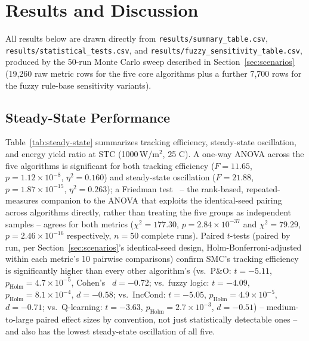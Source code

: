 \section{Results and Discussion}
\label{sec:results}

All results below are drawn directly from
\texttt{results/summary\_table.csv}, \texttt{results/statistical\_tests.csv},
and \texttt{results/fuzzy\_sensitivity\_table.csv}, produced by the 50-run
Monte Carlo sweep described in Section~\ref{sec:scenarios} (19,260 raw
metric rows for the five core algorithms plus a further 7,700 rows for the
fuzzy rule-base sensitivity variants).

\subsection{Steady-State Performance}
Table~\ref{tab:steady-state} summarizes tracking efficiency, steady-state
oscillation, and energy yield ratio at STC (1000\,W/m$^2$, 25\textdegree
C). A one-way ANOVA across the five algorithms is significant for both
tracking efficiency ($F=11.65$, $p=1.12\times10^{-8}$, $\eta^2=0.160$) and
steady-state oscillation ($F=21.88$, $p=1.87\times10^{-15}$,
$\eta^2=0.263$); a Friedman test~\cite{friedman1937use} -- the rank-based,
repeated-measures companion to the ANOVA that exploits the identical-seed
pairing across algorithms directly, rather than treating the five groups
as independent samples -- agrees for both metrics ($\chi^2=177.30$,
$p=2.84\times10^{-37}$ and $\chi^2=79.29$, $p=2.46\times10^{-16}$
respectively, $n=50$ complete runs). Paired $t$-tests (paired by run, per
Section~\ref{sec:scenarios}'s identical-seed design, Holm-Bonferroni-adjusted~\cite{holm1979simple}
within each metric's 10 pairwise comparisons) confirm SMC's tracking
efficiency is significantly higher than every other algorithm's (vs.\
P\&O: $t=-5.11$, $p_{\text{Holm}}=4.7\times10^{-5}$, Cohen's~\cite{cohen1988statistical} $d=-0.72$;
vs.\ fuzzy logic: $t=-4.09$, $p_{\text{Holm}}=8.1\times10^{-4}$, $d=-0.58$;
vs.\ IncCond: $t=-5.05$, $p_{\text{Holm}}=4.9\times10^{-5}$, $d=-0.71$;
vs.\ Q-learning: $t=-3.63$, $p_{\text{Holm}}=2.7\times10^{-3}$, $d=-0.51$)
-- medium-to-large paired effect sizes by convention, not just
statistically detectable ones -- and also has the lowest steady-state
oscillation of all five.

